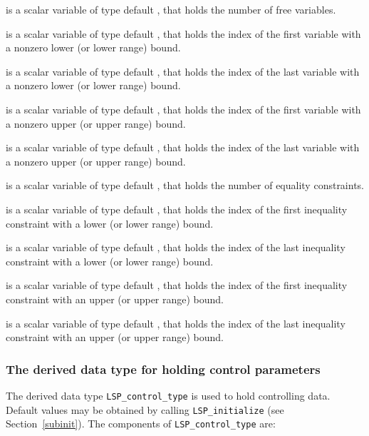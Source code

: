 \documentclass{galahad}
\newcommand{\packagename}{LSP}
\begin{document}
\begin{description}
 is a scalar variable of type default \integer, that holds the
number of free variables.

 is a scalar variable of type default \integer, that holds the
index of the first variable with a nonzero lower (or lower range) bound.

 is a scalar variable of type default \integer, that holds the
index of the last variable with a nonzero lower (or lower range) bound.

 is a scalar variable of type default \integer, that holds the
index of the first variable with a nonzero upper (or upper range) bound.

 is a scalar variable of type default \integer, that holds the
index of the last variable with a nonzero upper (or upper range) bound.

 is a scalar variable of type default \integer, that holds the
number of equality constraints.

 is a scalar variable of type default \integer, that holds the
index of the first inequality constraint with a lower (or lower range) bound.

 is a scalar variable of type default \integer, that holds the
index of the last inequality constraint with a lower (or lower range) bound.

 is a scalar variable of type default \integer, that holds the
index of the first inequality constraint with an upper (or upper range) bound.

 is a scalar variable of type default \integer, that holds the
index of the last inequality constraint with an upper (or upper range) bound.

\end{description}


\subsubsection{The derived data type for holding control
 parameters}\label{typecontrol}
The derived data type
{\tt \packagename\_control\_type}
is used to hold controlling data. Default values may be obtained by calling
{\tt \packagename\_initialize}
(see Section~\ref{subinit}). The components of
{\tt \packagename\_control\_type}
are:
\end{document}
